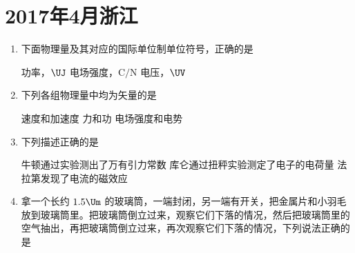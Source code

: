 \documentclass[\gkver]{gaokaozhenti}
\begin{document}
\chapter{2017年4月浙江}

\begin{enumerate}
\item
下面物理量及其对应的国际单位制单位符号，正确的是

{功率，$\UJ$}
{电场强度，$\mathrm{C}/\mathrm{N}$}
{电压，$\UV$}


\item
下列各组物理量中均为矢量的是

{速度和加速度}
{力和功}
{电场强度和电势}


\item
下列描述正确的是

{牛顿通过实验测出了万有引力常数}
{库仑通过扭秤实验测定了电子的电荷量}
{法拉第发现了电流的磁效应}


\item
拿一个长约 $1.5\Um$ 的玻璃筒，一端封闭，另一端有开关，把金属片和小羽毛放到玻璃筒里。把玻璃筒倒立过来，观察它们下落的情况，然后把玻璃筒里的空气抽出，再把玻璃筒倒立过来，再次观察它们下落的情况，下列说法正确的是


\end{enumerate}
\end{document}
